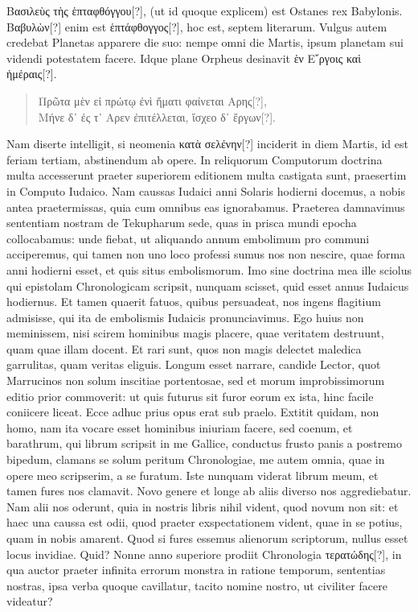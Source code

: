 \textgreek{Βασιλεὺς τὴς ἑπταφθόγγου[?]},
 (ut id quoque explicem) est Ostanes rex Babylonis.
\textgreek{Βαβυλὼν[?]} enim est \textgreek{ἑπτάφθογγος[?]},
 hoc est, septem literarum.
Vulgus autem credebat Planetas apparere die suo: nempe omni
die Martis, ipsum planetam sui videndi potestatem facere.
Idque plane Orpheus desinavit \textgreek{ἑν Ε῎ργοις καὶ ἡμέραις[?]}.
\begin{verse}
\textgreek{Πρῶτα μὲν εἰ πρώτῳ ἐνὶ ἤματι φαίνεται Αρης[?]},\\
\textgreek{Μήνε δ᾽ ἐς τ᾽ Αρεν ἐπιτέλλεται, ἴσχεο δ᾽ ἔργων[?]}.
\end{verse}
Nam diserte intelligit, si neomenia
 \textgreek{κατὰ σελένην[?]} inciderit in diem
Martis, id est feriam tertiam, abstinendum ab opere.
In reliquorum
Computorum doctrina multa accesserunt praeter superiorem editionem
multa castigata sunt, praesertim in Computo Iudaico.
Nam
caussas Iudaici anni Solaris hodierni docemus, a nobis antea praetermissas,
quia cum omnibus eas ignorabamus.
Praeterea damnavimus sententiam nostram de Tekupharum sede,
 quas in prisca
mundi epocha collocabamus: unde fiebat, ut aliquando annum
embolimum pro communi acciperemus, qui tamen non uno loco
professi sumus nos non nescire, quae forma anni hodierni esset, et
quis situs embolismorum.
Imo sine doctrina mea ille sciolus qui
epistolam Chronologicam scripsit, nunquam scisset, quid esset
annus Iudaicus hodiernus.
Et tamen quaerit fatuos, quibus persuadeat,
nos ingens flagitium admisisse, qui ita de embolismis Iudaicis
pronunciavimus.
Ego huius non meminissem, nisi scirem hominibus
magis placere, quae veritatem destruunt, quam quae illam docent.
Et rari sunt, quos non magis delectet maledica garrulitas,
quam veritas eliguis.
Longum esset narrare, candide Lector,
quot Marrucinos non solum inscitiae portentosae, sed et morum
improbissimorum editio prior commoverit: ut quis futurus sit furor
eorum ex ista, hinc facile coniicere liceat.
Ecce adhuc prius opus erat sub praelo.
Extitit quidam, non homo, nam ita vocare esset
hominibus iniuriam facere, sed coenum, et barathrum, qui librum
scripsit in me Gallice, conductus frusto panis a postremo bipedum,
clamans se solum peritum Chronologiae, me autem omnia, quae
in opere meo scripserim, a se furatum.
Iste nunquam viderat librum
meum, et tamen fures nos clamavit.
Novo genere et longe ab
aliis diverso nos aggrediebatur.
Nam alii nos oderunt, quia in
nostris libris nihil vident, quod novum non sit: et haec una caussa
est odii, quod praeter exspectationem vident, quae in se potius, quam
in nobis amarent.
Quod si fures essemus alienorum scriptorum, nullus
esset locus invidiae.
Quid?
Nonne anno superiore prodiit Chronologia
\textgreek{τερατώδης[?]}, in qua auctor praeter infinita errorum monstra
in ratione temporum, sententias nostras, ipsa verba quoque cavillatur,
tacito nomine nostro, ut civiliter facere videatur?

